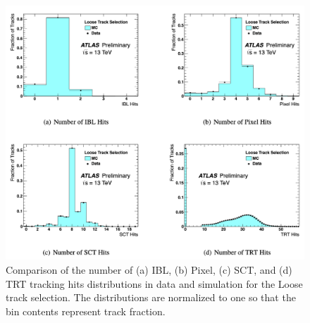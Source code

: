 \begin{figure}
	\centering
	\includegraphics[width=\textwidth]{id_subdetector_hits}
	\caption{Comparison of the number of (a) IBL, (b) Pixel, (c) SCT, and (d) TRT tracking hits distributions in data and simulation for the Loose track selection. The distributions are normalized to one so that the bin contents represent track fraction. \cite{ATL-PHYS-PUB-2015-018}
	}
	\label{fig:id_subdetector_hits}
\end{figure}


